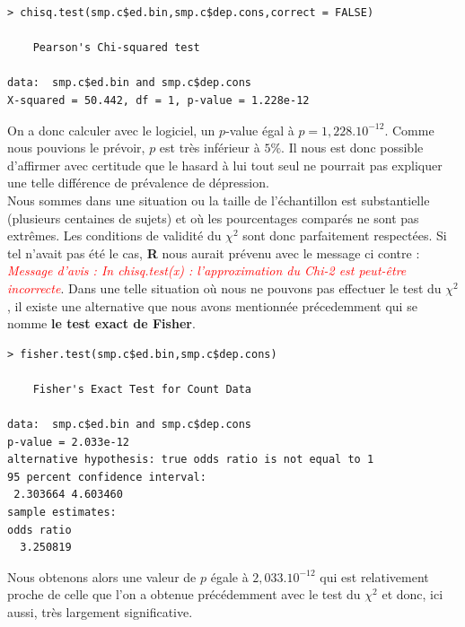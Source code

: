 \begin{lstlisting}[language=html]
> chisq.test(smp.c$ed.bin,smp.c$dep.cons,correct = FALSE)

	Pearson's Chi-squared test

data:  smp.c$ed.bin and smp.c$dep.cons
X-squared = 50.442, df = 1, p-value = 1.228e-12
\end{lstlisting}
On a donc calculer avec le logiciel, un $p$-value égal à $p = 1,228.10^{-12}$.\newline
Comme nous pouvions le prévoir, $p$ est très inférieur à $5\%$. Il nous est donc possible d'affirmer avec certitude que le hasard à lui tout seul ne pourrait pas expliquer une telle différence de prévalence de dépression.\newline
\\
Nous sommes dans une situation ou la taille de l'échantillon est substantielle (plusieurs centaines de sujets) et où les pourcentages comparés ne sont pas extrêmes. Les conditions de validité du $\chi^{2}$ sont donc parfaitement respectées.\newline
Si tel n'avait pas été le cas, \textbf{R} nous aurait prévenu avec le message ci contre : \textcolor{red}{\textit{Message d'avis : In chisq.test(x) : l'approximation du Chi-2 est peut-être incorrecte}}.\newline
Dans une telle situation où nous ne pouvons pas effectuer le test du $\chi^{2}$, il existe une alternative que nous avons mentionnée précedemment qui se nomme \textbf{le test exact de Fisher}.

\begin{lstlisting}[language=html]
> fisher.test(smp.c$ed.bin,smp.c$dep.cons)

	Fisher's Exact Test for Count Data

data:  smp.c$ed.bin and smp.c$dep.cons
p-value = 2.033e-12
alternative hypothesis: true odds ratio is not equal to 1
95 percent confidence interval:
 2.303664 4.603460
sample estimates:
odds ratio 
  3.250819 
\end{lstlisting}
Nous obtenons alors une valeur de $p$ égale à $2,033.10^{-12}$ qui est relativement proche de celle que l'on a obtenue précédemment avec le test du $\chi^{2}$ et donc, ici aussi, très largement significative.
\newpage

